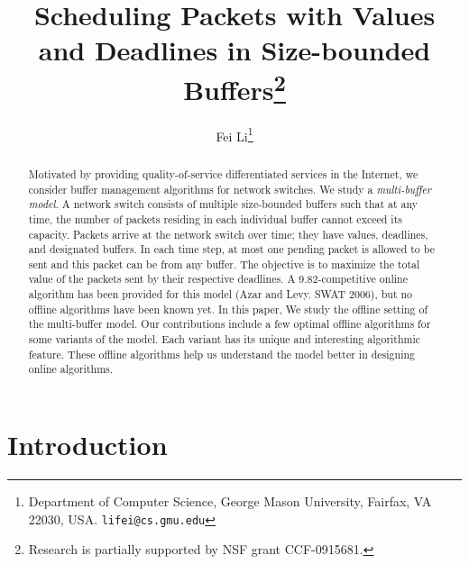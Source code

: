 \documentclass[final, 11pt]{article}
\begin{document}
\title{Scheduling Packets with Values and Deadlines in Size-bounded Buffers\thanks{Research is partially supported by NSF grant CCF-0915681.}}

\author{Fei Li\thanks{Department of Computer Science, George Mason University, Fairfax, VA 22030, USA. {\tt lifei@cs.gmu.edu}}}

\maketitle


\begin{abstract}
Motivated by providing quality-of-service differentiated services in the Internet, we consider buffer management algorithms for network switches. We study a {\em multi-buffer model}. A network switch consists of multiple size-bounded buffers such that at any time, the number of packets residing in each individual buffer cannot exceed its capacity. Packets arrive at the network switch over time; they have values, deadlines, and designated buffers. In each time step, at most one pending packet is allowed to be sent and this packet can be from any buffer. The objective is to maximize the total value of the packets sent by their respective deadlines. A $9.82$-competitive online algorithm has been provided for this model (Azar and Levy. SWAT 2006), but no offline algorithms have been known yet. In this paper, We study the offline setting of the multi-buffer model. Our contributions include a few optimal offline algorithms for some variants of the model. Each variant has its unique and interesting algorithmic feature. These offline algorithms help us understand the model better in designing online algorithms.
\end{abstract}

\newpage


\section{Introduction}
\end{document}
